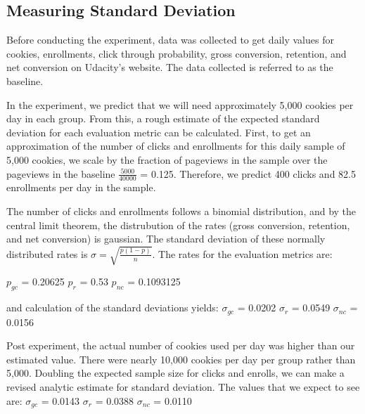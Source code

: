 \documentclass[paper=a4, fontsize=11pt]{scrartcl} %
\numberwithin{equation}{section} %
\numberwithin{figure}{section} %
\numberwithin{table}{section} %
\begin{document}

\subsection{Measuring Standard Deviation}

Before conducting the experiment, data was collected to get daily values for cookies, enrollments, click through probability, gross conversion, retention, and net conversion on Udacity's website.  The data collected is referred to as the baseline. \newline

In the experiment, we predict that we will need approximately 5,000 cookies per day in each group.  From this, a rough estimate of the expected standard deviation for each evaluation metric can be calculated.  First, to get an approximation of the number of clicks and enrollments for this daily sample of 5,000 cookies, we scale by the fraction of pageviews in the sample over the pageviews in the baseline $\frac{5000}{40000}$ = 0.125.  Therefore, we predict 400 clicks and 82.5 enrollments per day in the sample. \newline

The number of clicks and enrollments follows a binomial distribution, and by the central limit theorem, the distrubution of the rates (gross conversion, retention, and net conversion) is gaussian. The standard deviation of these normally distributed rates is $\sigma = \sqrt{\frac{p(1-p)}{n}}$.  The rates for the evaluation metrics are: \newline

$p_{gc}$ = 0.20625\quad
$p_{r}$ = 0.53\quad
$p_{nc}$ = 0.1093125
\newline

and calculation of the standard deviations yields: \newline \newline
$\sigma_{gc}$ = 0.0202\quad
$\sigma_{r}$ = 0.0549\quad
$\sigma_{nc}$ = 0.0156
\newline

Post experiment, the actual number of cookies used per day was higher than our estimated value.  There were nearly 10,000 cookies per day per group rather than 5,000.  Doubling the expected sample size for clicks and enrolls, we can make a revised analytic estimate for standard deviation.  The values that we expect to see are:
\newline
\newline
$\sigma_{gc}$ = 0.0143\quad
$\sigma_{r}$ = 0.0388\quad
$\sigma_{nc}$ = 0.0110
\newline
\end{document}
